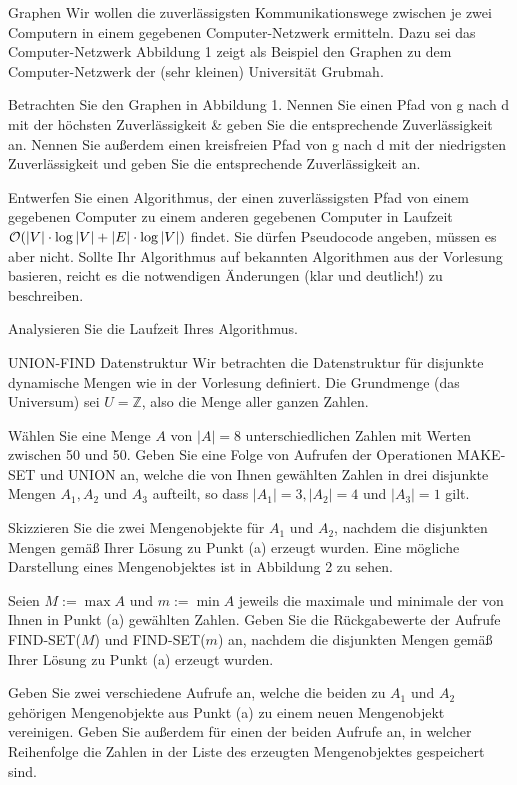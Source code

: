 \documentclass{exercisesheet}
\begin{document}
\begin{eexercises}{Graphen}{
    Wir wollen die zuverlässigsten Kommunikationswege zwischen je zwei Computern in einem gegebenen Computer-Netzwerk ermitteln. Dazu sei das Computer-Netzwerk Abbildung 1 zeigt als Beispiel den Graphen zu dem Computer-Netzwerk der (sehr kleinen) Universität Grubmah.
  }
  \item Betrachten Sie den Graphen in Abbildung 1. Nennen Sie einen Pfad von g nach d mit der höchsten Zuverlässigkeit \& geben Sie die entsprechende Zuverlässigkeit an. Nennen Sie außerdem einen kreisfreien Pfad von g nach d mit der niedrigsten Zuverlässigkeit und geben Sie die entsprechende Zuverlässigkeit an.
  \item Entwerfen Sie einen Algorithmus, der einen zuverlässigsten Pfad von einem gegebenen Computer zu einem anderen gegebenen Computer in Laufzeit $\mathcal{O}(|V| \cdot \log|V| + |E| \cdot \log|V|)$ findet. Sie dürfen Pseudocode angeben, müssen es aber nicht. Sollte Ihr Algorithmus auf bekannten Algorithmen aus der Vorlesung basieren, reicht es die notwendigen Änderungen (klar und deutlich!) zu beschreiben.
  \item Analysieren Sie die Laufzeit Ihres Algorithmus.
\end{eexercises}

\begin{eexercises}{UNION-FIND Datenstruktur}{
    Wir betrachten die Datenstruktur für disjunkte dynamische Mengen wie in der Vorlesung definiert. Die Grundmenge (das Universum) sei $U = \mathbb{Z}$, also die Menge aller ganzen Zahlen.
  }
  \item Wählen Sie eine Menge $A$ von $|A| = 8$ unterschiedlichen Zahlen mit Werten zwischen 50 und 50. Geben Sie eine Folge von Aufrufen der Operationen MAKE-SET und UNION an, welche die von Ihnen gewählten Zahlen in drei disjunkte Mengen $A_1, A_2$ und $A_3$ aufteilt, so dass $|A_1| = 3, |A_2| = 4$ und $|A_3| = 1$ gilt.
  \item Skizzieren Sie die zwei Mengenobjekte für $A_1$ und $A_2$, nachdem die disjunkten Mengen gemäß Ihrer Lösung zu Punkt (a) erzeugt wurden. Eine mögliche Darstellung eines Mengenobjektes ist in Abbildung 2 zu sehen.
  \item Seien $M := \max A$ und $m := \min A$ jeweils die maximale und minimale der von Ihnen in Punkt (a) gewählten Zahlen. Geben Sie die Rückgabewerte der Aufrufe FIND-SET($M$) und FIND-SET($m$) an, nachdem die disjunkten Mengen gemäß Ihrer Lösung zu Punkt (a) erzeugt wurden.
  \item Geben Sie zwei verschiedene Aufrufe an, welche die beiden zu $A_1$ und $A_2$ gehörigen Mengenobjekte aus Punkt (a) zu einem neuen Mengenobjekt vereinigen. Geben Sie außerdem für einen der beiden Aufrufe an, in welcher Reihenfolge die Zahlen in der Liste des erzeugten Mengenobjektes gespeichert sind.
\end{eexercises}
\end{document}
